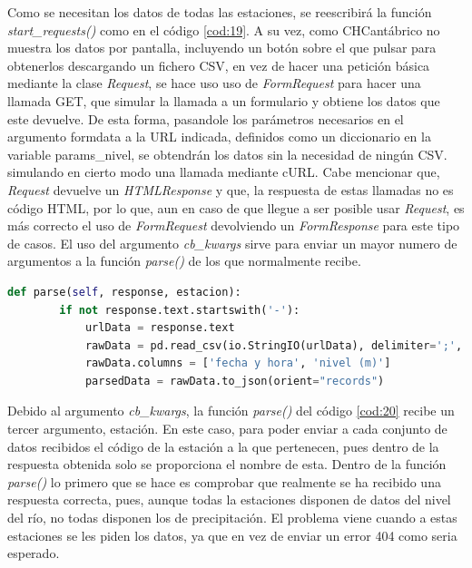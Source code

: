 Como se necesitan los datos de todas las estaciones, se reescribirá la función \textit{start\_requests()} como en el código \ref{cod:19}.\newline
\newline
A su vez, como CHCantábrico no muestra los datos por pantalla, incluyendo un botón sobre el que pulsar para obtenerlos descargando un fichero CSV, en vez de hacer una petición básica mediante la clase \textit{Request}, se hace uso uso de \textit{FormRequest} para hacer una llamada GET, que simular la llamada a un formulario y obtiene los datos que este devuelve.\newline
\newline
De esta forma, pasandole los parámetros necesarios en el argumento formdata a la URL indicada, definidos como un diccionario en la variable params\_nivel, se obtendrán los datos sin la necesidad de ningún CSV. simulando en cierto modo una llamada mediante cURL.\newline
\newline
Cabe mencionar que, \textit{Request} devuelve un \textit{HTMLResponse} y que, la respuesta de estas llamadas no es código HTML, por lo que, aun en caso de que llegue a ser posible usar \textit{Request}, es más correcto el uso de \textit{FormRequest} devolviendo un \textit{FormResponse} para este tipo de casos.\newline
\newline
El uso del argumento \textit{cb\_kwargs} sirve para enviar un mayor numero de argumentos a la función \textit{parse()} de los que normalmente recibe.

\begin{lstlisting}[language=Python, caption={Función \textit{parse()} CHCantábrico Nivel Spider}, label=cod:20]
	def parse(self, response, estacion):
		if not response.text.startswith('-'):
			urlData = response.text
			rawData = pd.read_csv(io.StringIO(urlData), delimiter=';', encoding='utf-8', header=1)
			rawData.columns = ['fecha y hora', 'nivel (m)']
			parsedData = rawData.to_json(orient="records")
\end{lstlisting}

Debido al argumento \textit{cb\_kwargs}, la función \textit{parse()} del código \ref{cod:20} recibe un tercer argumento, estación. En este caso, para poder enviar a cada conjunto de datos recibidos el código de la estación a la que pertenecen, pues dentro de la respuesta obtenida solo se proporciona el nombre de esta. Dentro de la función \textit{parse()} lo primero que se hace es comprobar que realmente se ha recibido una respuesta correcta, pues, aunque todas la estaciones disponen de datos del nivel del río, no todas disponen los de precipitación. El problema viene cuando a estas estaciones se les piden los datos, ya que en vez de enviar un error 404 como seria esperado.

